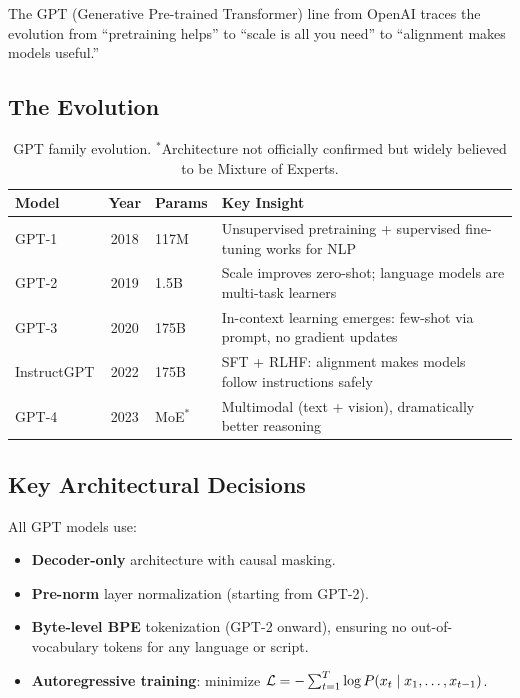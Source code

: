 The GPT (Generative Pre-trained Transformer) line from OpenAI traces the
evolution from ``pretraining helps'' to ``scale is all you need'' to
``alignment makes models useful.''

\subsection{The Evolution}

\begin{table}[H]
\centering
\small
\begin{tabularx}{\textwidth}{@{}l c l X@{}}
\toprule
\textbf{Model} & \textbf{Year} & \textbf{Params} & \textbf{Key Insight} \\
\midrule
GPT-1    & 2018 & 117M  & Unsupervised pretraining + supervised fine-tuning works for NLP \\
GPT-2    & 2019 & 1.5B  & Scale improves zero-shot; language models are multi-task learners \\
GPT-3    & 2020 & 175B  & In-context learning emerges: few-shot via prompt, no gradient updates \\
InstructGPT & 2022 & 175B & SFT + RLHF: alignment makes models follow instructions safely \\
GPT-4    & 2023 & MoE$^*$ & Multimodal (text + vision), dramatically better reasoning \\
\bottomrule
\end{tabularx}
\caption{GPT family evolution.  $^*$Architecture not officially confirmed but
widely believed to be Mixture of Experts.}
\label{tab:gpt-family}
\end{table}

\subsection{Key Architectural Decisions}

All GPT models use:
\begin{itemize}
    \item \textbf{Decoder-only} architecture with causal masking.
    \item \textbf{Pre-norm} layer normalization (starting from GPT-2).
    \item \textbf{Byte-level BPE} tokenization (GPT-2 onward), ensuring no
          out-of-vocabulary tokens for any language or script.
    \item \textbf{Autoregressive training}: minimize
          $\mathcal{L} = -\sum_{t=1}^{T} \log P(x_t \mid x_1, \ldots, x_{t-1})$.
\end{itemize}

